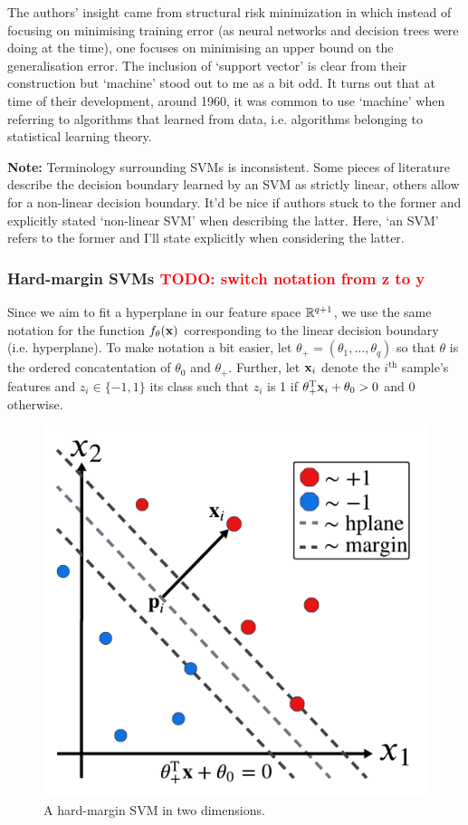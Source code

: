 \documentclass[11pt]{article}
\begin{document}
The authors' insight came from structural risk minimization in which instead of focusing on minimising training error (as neural networks and decision trees were doing at the time), one focuses on minimising an upper bound on the generalisation error. The inclusion of `support vector' is clear from their construction but `machine' stood out to me as a bit odd. It turns out that at time of their development, around 1960, it was common to use `machine' when referring to algorithms that learned from data, i.e. algorithms belonging to statistical learning theory.

\vspace{14pt}
\noindent\textbf{Note:} Terminology surrounding SVMs is inconsistent. Some pieces of literature describe the decision boundary learned by an SVM as strictly linear, others allow for a non-linear decision boundary. It'd be nice if authors stuck to the former and explicitly stated `non-linear SVM' when describing the latter. Here, `an SVM' refers to the former and I'll state explicitly when considering the latter.

\subsubsection{Hard-margin SVMs \textcolor{red}{TODO: switch notation from z to y}}
Since we aim to fit a hyperplane in our feature space $\mathbb{R}^{q+1}$, we use the same notation for the function $f_{\theta}(\mathbf{x})$ corresponding to the linear decision boundary (i.e. hyperplane). To make notation a bit easier, let $\theta_+=(\theta_1,\dots,\theta_q)$ so that $\theta$ is the ordered concatentation of $\theta_0$ and $\theta_+$. Further, let $\mathbf{x}_i$ denote the $i^{\text{th}}$ sample's features and $z_i\in\{-1,1\}$ its class such that $z_i$ is 1 if $\theta_+^{\text{T}}\mathbf{x}_i+\theta_0>0$ and 0 otherwise.

\begin{figure}[ht]
    \centering
    \includegraphics[width=0.75\columnwidth]{./figures/supervised_learning/SVMs/SVM_hard_margin.pdf}
    \caption{A hard-margin SVM in two dimensions.}
    \label{fig:SVM_hard_margin}
\end{figure}
\end{document}
